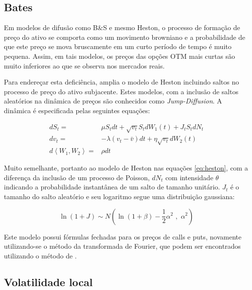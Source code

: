 \documentclass[]{book}
\theoremstyle{definition}
\theoremstyle{definition}
\theoremstyle{definition}
\theoremstyle{remark}
\begin{document}
\subsection{Bates}\label{bates}

Em modelos de difusão como B\&S e mesmo Heston, o processo de formação
de preço do ativo se comporta como um movimento browniano e a
probabilidade de que este preço se mova bruscamente em um curto período
de tempo é muito pequena. Assim, em tais modelos, os preços das opções
OTM mais curtas são muito inferiores ao que se observa nos mercados
reais.

Para endereçar esta deficiência, \citet{Bates1996} amplia o modelo de
Heston incluindo saltos no processo de preço do ativo subjacente. Estes
modelos, com a inclusão de saltos aleatórios na dinâmica de preços são
conhecidos como \emph{Jump-Diffusion}. A dinâmica é especificada pelas
seguintes equações:

\begin{equation}
\begin{aligned}
dS_t=&\mu S_tdt+\sqrt{v_t}S_tdW_1(t)+J_t S_t dN_t\\
dv_t=&-\lambda(v_t-\bar v)dt+\eta\sqrt{v_t}dW_2(t)\\
d\left\langle W_1, W_2 \right\rangle =&\rho dt
\end{aligned}
\label{eq:bates}
\end{equation}

Muito semelhante, portanto ao modelo de Heston nas equações
\eqref{eq:heston}, com a diferença da inclusão de um processo de Poisson,
\(dN_t\) com intensidade \(\theta\) indicando a probabilidade
instantânea de um salto de tamanho unitário. \(J_t\) é o tamanho do
salto aleatório e seu logaritmo segue uma distribuição gaussiana:

\begin{equation}
\ln{(1+J)}\sim N\left(\ln(1+\beta)-\frac{1}{2}\alpha^2\,\, ,\,\,\alpha^2\right)
\label{eq:jt}
\end{equation}

Este modelo possui fórmulas fechadas para os preços de calls e puts,
novamente utilizando-se o método da transformada de Fourier, que podem
ser encontrados utilizando o método de \citet{Duffie2000}.

\subsection{Volatilidade local}\label{volatilidade-local}
\end{document}
